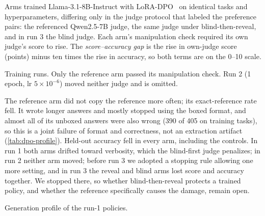Arms trained Llama-3.1-8B-Instruct with LoRA-DPO~\citep{rafailov2023dpo,hu2022lora} on identical tasks and hyperparameters, differing only in the judge protocol that labeled the preference pairs: the referenced Qwen2.5-7B judge, the same judge under blind-then-reveal, and in run 3 the blind judge. Each arm's manipulation check required its own judge's score to rise. The \emph{score--accuracy gap} is the rise in own-judge score (points) minus ten times the rise in accuracy, so both terms are on the 0--10 scale.

\begin{table}[htbp]
\centering
\caption{Training runs. Only the reference arm passed its manipulation check. Run 2 (1 epoch, lr $5{\times}10^{-6}$) moved neither judge and is omitted.\pre}
\label{tab:dpo}
\footnotesize
\setlength{\tabcolsep}{3pt}
\begin{adjustbox}{max width=\linewidth}\end{adjustbox}

\end{table}

The reference arm did not copy the reference more often; its exact-reference rate fell. It wrote longer answers and mostly stopped using the boxed format, and almost all of its unboxed answers were also wrong (390 of 405 on training tasks), so this is a joint failure of format and correctness, not an extraction artifact (\cref{tab:dpo-profile}). Held-out accuracy fell in every arm, including the controls. In run 1 both arms drifted toward verbosity, which the blind-first judge penalizes; in run 2 neither arm moved; before run 3 we adopted a stopping rule allowing one more setting, and in run 3 the reveal and blind arms lost score and accuracy together. We stopped there, so whether blind-then-reveal protects a trained policy, and whether the reference specifically causes the damage, remain open.

\begin{table}[htbp]
\centering
\caption{Generation profile of the run-1 policies.\ph}
\label{tab:dpo-profile}
\scriptsize
\setlength{\tabcolsep}{3pt}
\begin{adjustbox}{max width=\linewidth}\end{adjustbox}

\end{table}

